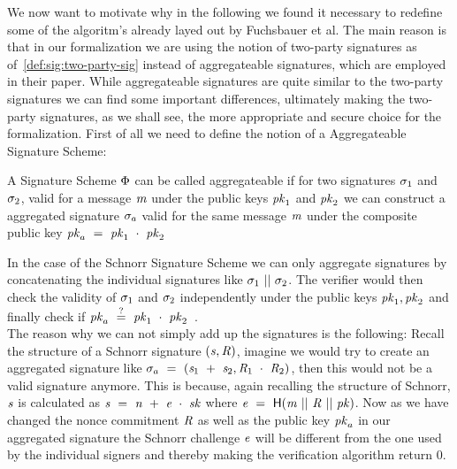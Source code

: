 We now want to motivate why in the following we found it necessary to redefine some of the algoritm's already layed out by Fuchsbauer et al.
The main reason is that in our formalization we are using the notion of two-party signatures as of~\cref{def:sig:two-party-sig} instead of aggregateable signatures, which are employed in their paper.
While aggregateable signatures are quite similar to the two-party signatures we can find some important differences, ultimately making the two-party signatures, as we shall see, the more appropriate and secure choice for the formalization.
First of all we need to define the notion of a Aggregateable Signature Scheme:
\begin{definition} \label{def:atom:aggsig}
    A Signature Scheme $\Phi$ can be called aggregateable if for two signatures $\sigma_1$ and $\sigma_2$, valid for a message $\mathit{m}$ under the public keys $\mathit{pk}_1$ and $\mathit{pk}_2$ we can construct a aggregated signature $\sigma_a$ valid for the same message $\mathit{m}$ under the composite public key $\mathit{pk}_a ~=~ \mathit{pk}_1 ~\cdot~ \mathit{pk}_2$
\end{definition}
In the case of the Schnorr Signature Scheme we can only aggregate signatures by concatenating the individual signatures like $\sigma_1 ~||~ \sigma_2$.
The verifier would then check the validity of $\sigma_1$ and $\sigma_2$ independently under the public keys $\mathit{pk}_1, \mathit{pk}_2$ and finally check if $\mathit{pk}_a ~\stackrel{?}{=}~ \mathit{pk}_1 ~\cdot~ \mathit{pk}_2$~\cite{fuchsbauer2019aggregate}. \\
The reason why we can not simply add up the signatures is the following:
Recall the structure of a Schnorr signature $(\mathit{s}, \mathit{R})$, imagine we would try to create an aggregated signature like $\sigma_a ~=~ (\mathit{s}_1 ~+~ \mathit{s}_2, \mathit{R}_1 ~\cdot~ \mathit{R}_2)$, then this would not be a valid signature anymore.
This is because, again recalling the structure of Schnorr, $\mathit{s}$ is calculated as $\mathit{s} ~=~ \mathit{n} ~+~ \mathit{e} ~\cdot~ \mathit{sk}$ where $\mathit{e} ~=~ \mathsf{H} (\mathit{m} ~||~ \mathit{R} ~||~ \mathit{pk})$.
Now as we have changed the nonce commitment $\mathit{R}$ as well as the public key $\mathit{pk}_a$ in our aggregated signature the Schnorr challenge $\mathit{e}$ will be different from the one used by the individual signers and thereby making the verification algorithm return 0.
